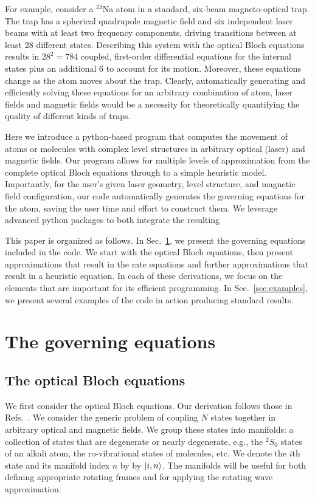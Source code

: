 \documentclass[final,5p,times,twocolumn]{elsarticle}
\begin{document}
For example, consider a $^{23}$Na atom in a standard, six-beam magneto-optical trap.  The trap has a spherical quadrupole magnetic field and six independent laser beams with at least two frequency components, driving transitions between at least 28 different states.  Describing this system  with the optical Bloch equations results in $28^2=784$ coupled, first-order differential equations for the internal states plus an additional 6 to account for its motion.  Moreover, these equations change as the atom moves about the trap.  Clearly, automatically generating and efficiently solving these equations for an arbitrary combination of atom, laser fields and magnetic fields would be a necessity for theoretically quantifying the quality of different kinds of traps.  

Here we introduce a python-based program that computes the movement of atoms or molecules with complex level structures in arbitrary optical (laser) and magnetic fields.  Our program allows for multiple levels of approximation from the complete optical Bloch equations through to a simple heuristic model.  Importantly, for the user's given laser geometry, level structure, and magnetic field configuration, our code automatically generates the governing equations for the atom, saving the user time and effort to construct them.  We leverage advanced python packages to both integrate the resulting 

This paper is organized as follows.  In Sec.~\ref{sec:governing_equations}, we present the governing equations included in the code.  We start with the optical Bloch equations, then present approximations that result in the rate equations and further approximations that result in a heuristic equation.  In each of these derivations, we focus on the elements that are important for its efficient programming.  In Sec.~\ref{sec:examples}, we present several examples of the code in action producing standard results.

\section{The governing equations}
\label{sec:governing_equations}
\subsection{The optical Bloch equations}
We first consider the optical Bloch equations.
Our derivation follows those in Refs.~\cite{Gordon1980, Ungar1989, Devlin2018}.  
We consider the generic problem of coupling $N$ states together in arbitrary optical and magnetic fields.
We group these states into manifolds: a collection of states that are degenerate or nearly degenerate, e.g., the $^2S_0$ states of an alkali atom, the ro-vibrational states of molecules, etc.
We denote the $i$th state and its manifold index $n$ by by $\ket{i, n}$.
The manifolds will be useful for both defining appropriate rotating frames and for applying the rotating wave approximation.
\end{document}
